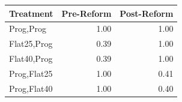 \begin{tabular}{lrr}
\toprule
Treatment & Pre-Reform & Post-Reform \\
\midrule
Prog,Prog & 1.00 & 1.00 \\
Flat25,Prog & 0.39 & 1.00 \\
Flat40,Prog & 0.39 & 1.00 \\
Prog,Flat25 & 1.00 & 0.41 \\
Prog,Flat40 & 1.00 & 0.40 \\
\bottomrule
\end{tabular}
